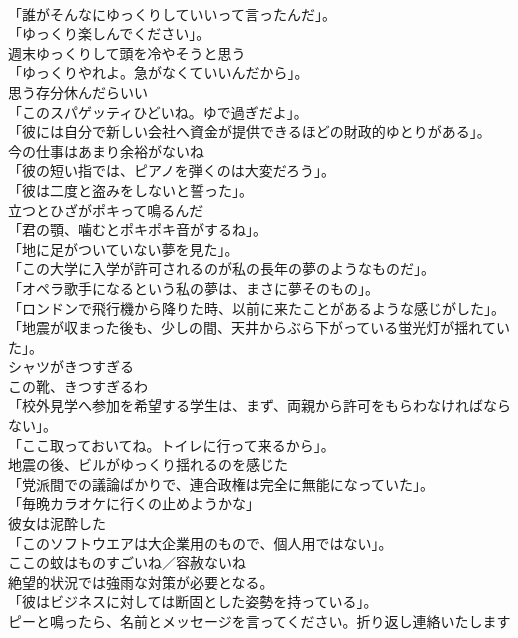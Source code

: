\documentclass[8pt]{extreport}
\begin{document}
\begin{CJK}{UTF8}{min}
\\	「誰がそんなにゆっくりしていいって言ったんだ」。	
\\	「ゆっくり楽しんでください」。	
\\	週末ゆっくりして頭を冷やそうと思う	
\\	「ゆっくりやれよ。急がなくていいんだから」。	
\\	思う存分休んだらいい	
\\	「このスパゲッティひどいね。ゆで過ぎだよ」。	
\\	「彼には自分で新しい会社へ資金が提供できるほどの財政的ゆとりがある」。	
\\	今の仕事はあまり余裕がないね	
\\	「彼の短い指では、ピアノを弾くのは大変だろう」。	
\\	「彼は二度と盗みをしないと誓った」。	
\\	立つとひざがポキって鳴るんだ	
\\	「君の顎、噛むとポキポキ音がするね」。	
\\	「地に足がついていない夢を見た」。	
\\	「この大学に入学が許可されるのが私の長年の夢のようなものだ」。	
\\	「オペラ歌手になるという私の夢は、まさに夢そのもの」。	
\\	「ロンドンで飛行機から降りた時、以前に来たことがあるような感じがした」。	
\\	「地震が収まった後も、少しの間、天井からぶら下がっている蛍光灯が揺れていた」。	
\\	シャツがきつすぎる 
\\	この靴、きつすぎるわ	
\\	「校外見学へ参加を希望する学生は、まず、両親から許可をもらわなければならない」。	
\\	「ここ取っておいてね。トイレに行って来るから」。	
\\	地震の後、ビルがゆっくり揺れるのを感じた	
\\	「党派間での議論ばかりで、連合政権は完全に無能になっていた」。	
\\	「毎晩カラオケに行くの止めようかな」	
\\	彼女は泥酔した	
\\	「このソフトウエアは大企業用のもので、個人用ではない」。	
\\	ここの蚊はものすごいね／容赦ないね	
\\	絶望的状況では強雨な対策が必要となる。	
\\	「彼はビジネスに対しては断固とした姿勢を持っている」。	
\\	ピーと鳴ったら、名前とメッセージを言ってください。折り返し連絡いたします	

\end{CJK}
\end{document}
